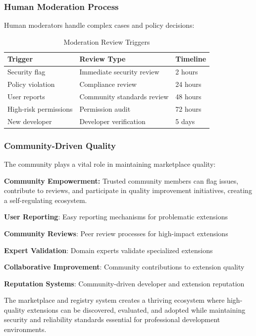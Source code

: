 \subsubsection{Human Moderation Process}
\label{subsubsec:human-moderation-process}

Human moderators handle complex cases and policy decisions:

\begin{table}[h]
\centering
\caption{Moderation Review Triggers}
\label{tab:moderation-triggers}
\begin{tabular}{@{}lll@{}}
\toprule
\textbf{Trigger} & \textbf{Review Type} & \textbf{Timeline} \\
\midrule
Security flag & Immediate security review & 2 hours \\
Policy violation & Compliance review & 24 hours \\
User reports & Community standards review & 48 hours \\
High-risk permissions & Permission audit & 72 hours \\
New developer & Developer verification & 5 days \\
\bottomrule
\end{tabular}
\end{table}

\subsubsection{Community-Driven Quality}
\label{subsubsec:community-driven-quality}

The community plays a vital role in maintaining marketplace quality:

\begin{successbox}
\textbf{Community Empowerment:} Trusted community members can flag issues, contribute to reviews, and participate in quality improvement initiatives, creating a self-regulating ecosystem.
\end{successbox}

\begin{compactlist}
\item \textbf{User Reporting}: Easy reporting mechanisms for problematic extensions
\item \textbf{Community Reviews}: Peer review processes for high-impact extensions
\item \textbf{Expert Validation}: Domain experts validate specialized extensions
\item \textbf{Collaborative Improvement}: Community contributions to extension quality
\item \textbf{Reputation Systems}: Community-driven developer and extension reputation
\end{compactlist}

The marketplace and registry system creates a thriving ecosystem where high-quality extensions can be discovered, evaluated, and adopted while maintaining security and reliability standards essential for professional development environments.